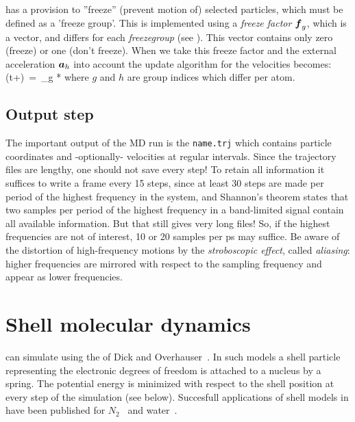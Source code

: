 {\gromacs} has a provision to ''freeze''  (prevent motion of) selected
particles, which must be defined as a 'freeze group'. This is implemented
using a {\em freeze factor $\mbox{\boldmath ${f}$}_g$}, which is a vector, and differs for each
{\em freezegroup} (see ). This vector contains only
zero (freeze) or one (don't freeze).
When we take this freeze factor and the external acceleration $\mbox{\boldmath ${a}$}_h$ into 
account the update algorithm for the velocities becomes:
\beq
{}(t+\hdt)~=~_g * \lambda * 
\eeq
where $g$ and $h$ are group indices which differ per atom.

\subsection{Output step}
The important output of the MD run is the {\em
{}} \verb'name.trj' which contains particle coordinates
and -optionally- velocities at regular intervals. Since the trajectory
files are lengthy, one should not save every step! To retain all
information it suffices to write a frame every 15 steps, since at
least 30 steps are made per period of the highest frequency in the
system, and Shannon's  theorem states that two samples per
period of the highest frequency in a band-limited signal contain all
available information. But that still gives very long files! So, if
the highest frequencies are not of interest, 10 or 20 samples per ps
may suffice. Be aware of the distortion of high-frequency motions by
the {\em stroboscopic effect}, called {\em aliasing}: higher frequencies
are  mirrored with respect to the sampling frequency and appear as
lower frequencies. 

\section{Shell molecular dynamics}
{\gromacs} can simulate  using the 
 of Dick and Overhauser~\cite{Dick58}. In such models
a shell particle representing the electronic degrees of freedom is
attached to a nucleus by a spring. The potential energy is minimized with
respect to the shell position  at every step of the simulation (see below).
Succesfull applications of shell models in {\gromacs} have been published
for $N_2$~\cite{Jordan95} and water~\cite{Maaren2001a}.

